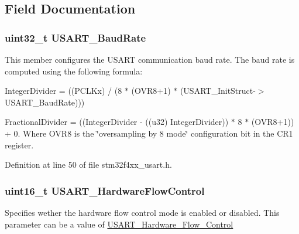 \subsection{Field Documentation}
\hypertarget{struct_u_s_a_r_t___init_type_def_a8712e31ee9d088d83c84d38d88c6af0b}{
\subsubsection[{U\-S\-A\-R\-T\-\_\-\-Baud\-Rate}]{\setlength{\rightskip}{0pt plus 5cm}uint32\-\_\-t U\-S\-A\-R\-T\-\_\-\-Baud\-Rate}}\label{struct_u_s_a_r_t___init_type_def_a8712e31ee9d088d83c84d38d88c6af0b}
This member configures the U\-S\-A\-R\-T communication baud rate. The baud rate is computed using the following formula\-:
\begin{DoxyItemize}
\item Integer\-Divider = ((P\-C\-L\-Kx) / (8 $\ast$ (O\-V\-R8+1) $\ast$ (U\-S\-A\-R\-T\-\_\-\-Init\-Struct-\/$>$U\-S\-A\-R\-T\-\_\-\-Baud\-Rate)))
\item Fractional\-Divider = ((Integer\-Divider -\/ ((u32) Integer\-Divider)) $\ast$ 8 $\ast$ (O\-V\-R8+1)) + 0. Where O\-V\-R8 is the \char`\"{}oversampling by 8 mode\char`\"{} configuration bit in the C\-R1 register. 
\end{DoxyItemize}

Definition at line 50 of file stm32f4xx\-\_\-usart.\-h.

\hypertarget{struct_u_s_a_r_t___init_type_def_ab41fe3b9f5cb4ed89be23bff0a1f4114}{
\subsubsection[{U\-S\-A\-R\-T\-\_\-\-Hardware\-Flow\-Control}]{\setlength{\rightskip}{0pt plus 5cm}uint16\-\_\-t U\-S\-A\-R\-T\-\_\-\-Hardware\-Flow\-Control}}\label{struct_u_s_a_r_t___init_type_def_ab41fe3b9f5cb4ed89be23bff0a1f4114}
Specifies wether the hardware flow control mode is enabled or disabled. This parameter can be a value of \hyperlink{group___u_s_a_r_t___hardware___flow___control}{U\-S\-A\-R\-T\-\_\-\-Hardware\-\_\-\-Flow\-\_\-\-Control} 

